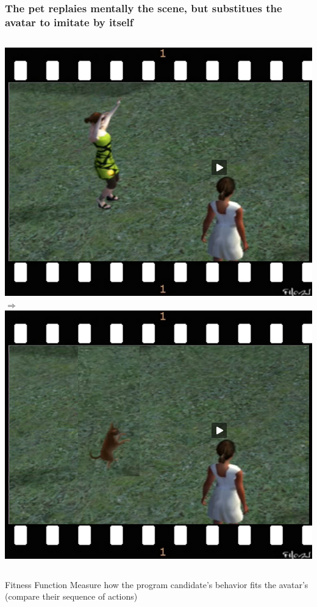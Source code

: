 \documentclass{beamer}
\begin{document}
\frame
{
  \frametitle{The pet \alert{replaies mentally} the scene,
    but \alert{substitues the avatar to imitate by itself}}
  \begin{columns}
    \column{1.9in}
    \includegraphics[scale=0.17]{movie_jill.png}
    \column{0.1in}
    $\Rightarrow$
    \column{2in}
    \includegraphics[scale=0.17]{movie_fido.png}
  \end{columns}

  \begin{beamerboxesrounded}{Fitness Function}
    Measure how the program
    \alert{candidate's behavior fits the avatar's}
    (compare their sequence of actions)
  \end{beamerboxesrounded}
}
\end{document}
